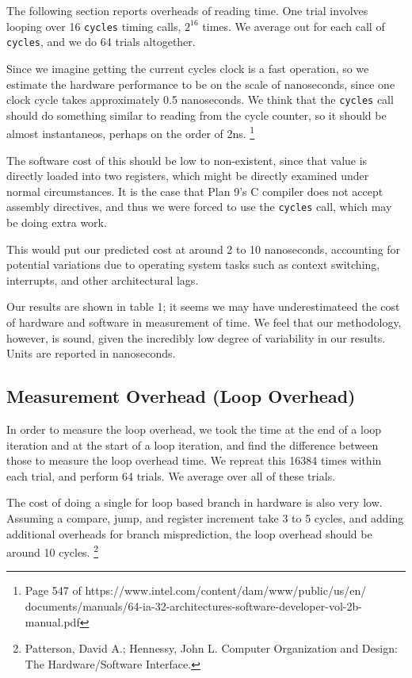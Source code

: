 \documentclass[letterpaper,twocolumn,10pt]{article}
\begin{document}
The following section reports overheads of reading time. One trial involves looping over 16 \texttt{cycles} timing calls, $2^{16}$ times. We average out for each call of \texttt{cycles}, and we do 64 trials altogether.

Since we imagine getting the current cycles clock is a fast operation, so we
estimate the hardware performance to be on the scale of nanoseconds, since one
clock cycle takes approximately 0.5 nanoseconds. We think that the
\texttt{cycles} call should do something similar to reading from the cycle
counter, so it should be almost instantaneos, perhaps on the order of 2ns.
\footnote{Page 547 of https://www.intel.com/content/dam/www/public/us/en/\\ 
documents/manuals/64-ia-32-architectures-software-developer-vol-2b-manual.pdf}

The software cost of this should be low to non-existent, since that value is 
directly loaded into two registers, which might be directly examined under normal 
circumstances. It is the case that Plan 9's C compiler does not accept assembly directives, 
and thus we were forced to use the \texttt{cycles} call, which may be doing extra work.

This would put our predicted cost at around 2 to 10 nanoseconds, accounting for potential
variations due to operating system tasks such as context switching, interrupts, and 
other architectural lags.

Our results are shown in table 1; it seems we may have underestimateed the cost of hardware 
and software in measurement of time. We feel that our methodology, however, is sound, given the
incredibly low degree of variability in our results. Units are reported in nanoseconds.

\subsection{Measurement Overhead (Loop Overhead)}

In order to measure the loop overhead, we took the time at the end of a loop
iteration and at the start of a loop iteration, and find the difference between
those to measure the loop overhead time. We repreat this 16384 times within
each trial, and perform 64 trials. We average over all of these trials.

The cost of doing a single for loop based branch in hardware is also very low.
Assuming a compare, jump, and register increment take 3 to 5 cycles, and adding
additional overheads for branch misprediction, the loop overhead should be around
10 cycles. 
\footnote{Patterson, David A.; Hennessy, John L. Computer Organization and Design: The Hardware/Software Interface.}
\end{document}
